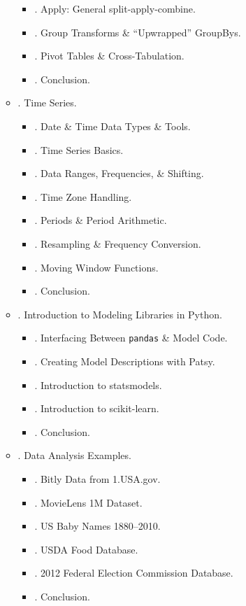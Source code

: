 \documentclass{article}
\begin{document}
\begin{enumerate}
\begin{itemize}
\begin{itemize}
			\item {. Apply: General split-apply-combine.}
			\item {. Group Transforms \& ``Upwrapped'' GroupBys.}
			\item {. Pivot Tables \& Cross-Tabulation.}
			\item {. Conclusion.}
		\end{itemize}
		\item {. Time Series.}
		\begin{itemize}
			\item {. Date \& Time Data Types \& Tools.}
			\item {. Time Series Basics.}
			\item {. Data Ranges, Frequencies, \& Shifting.}
			\item {. Time Zone Handling.}
			\item {. Periods \& Period Arithmetic.}
			\item {. Resampling \& Frequency Conversion.}
			\item {. Moving Window Functions.}
			\item {. Conclusion.}
		\end{itemize}
		\item {. Introduction to Modeling Libraries in Python.}
		\begin{itemize}
			\item {. Interfacing Between {\tt pandas} \& Model Code.}
			\item {. Creating Model Descriptions with Patsy.}
			\item {. Introduction to statsmodels.}
			\item {. Introduction to scikit-learn.}
			\item {. Conclusion.}
		\end{itemize}
		\item {. Data Analysis Examples.}
		\begin{itemize}
			\item {. Bitly Data from 1.USA.gov.}
			\item {. MovieLens 1M Dataset.}
			\item {. US Baby Names 1880--2010.}
			\item {. USDA Food Database.}
			\item {. 2012 Federal Election Commission Database.}
			\item {. Conclusion.}

\end{itemize}
\end{itemize}
\end{enumerate}
\end{document}
